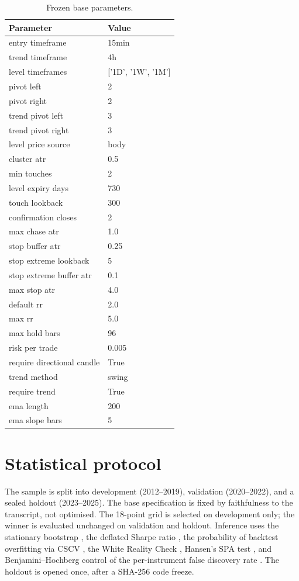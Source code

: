 \documentclass[11pt,a4paper]{article}
\begin{document}
\begin{table}[htbp]\centering\small
\caption{Frozen base parameters.}
\label{tab:design}
\begin{tabular}{ll}
\toprule
Parameter & Value \\
\midrule
entry timeframe & 15min \\
trend timeframe & 4h \\
level timeframes & ['1D', '1W', '1M'] \\
pivot left & 2 \\
pivot right & 2 \\
trend pivot left & 3 \\
trend pivot right & 3 \\
level price source & body \\
cluster atr & 0.5 \\
min touches & 2 \\
level expiry days & 730 \\
touch lookback & 300 \\
confirmation closes & 2 \\
max chase atr & 1.0 \\
stop buffer atr & 0.25 \\
stop extreme lookback & 5 \\
stop extreme buffer atr & 0.1 \\
max stop atr & 4.0 \\
default rr & 2.0 \\
max rr & 5.0 \\
max hold bars & 96 \\
risk per trade & 0.005 \\
require directional candle & True \\
trend method & swing \\
require trend & True \\
ema length & 200 \\
ema slope bars & 5 \\
\bottomrule
\end{tabular}
\end{table}
\section{Statistical protocol}
The sample is split into development (2012--2019), validation (2020--2022), and a sealed holdout (2023--2025). The base specification is fixed by faithfulness to the transcript, not optimised. The 18-point grid is selected on development only; the winner is evaluated unchanged on validation and holdout. Inference uses the stationary bootstrap \citep{politis1994stationary}, the deflated Sharpe ratio \citep{bailey2014deflated}, the probability of backtest overfitting via CSCV \citep{bailey2017probability}, the White Reality Check \citep{white2000reality}, Hansen's SPA test \citep{hansen2005test}, and Benjamini--Hochberg control of the per-instrument false discovery rate \citep{benjamini1995controlling}. The holdout is opened once, after a SHA-256 code freeze.
\end{document}
